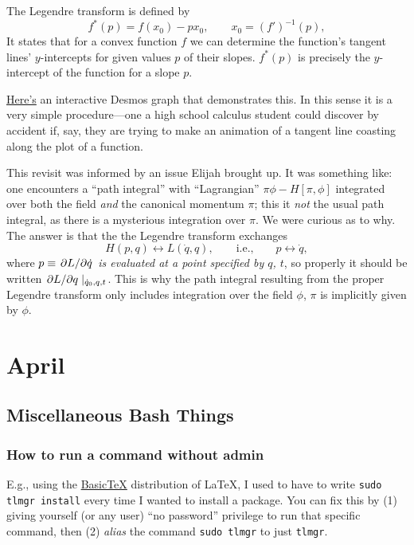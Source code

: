 \documentclass{report}
\begin{document}
\begin{thinbluebox}
The Legendre transform is defined by 
\begin{equation*}
	f^\ast(p) = f(x_0) - px_0, 
	\qquad x_0 = (f')^{-1}(p),
\end{equation*}
It states that for a convex function $ f $ we can determine the function's 
tangent lines' $ y $-intercepts for given values $ p $ of their slopes.
$ f^\ast(p) $ is precisely the $ y $-intercept of the function for a slope $ p $.
\end{thinbluebox}

\href{https://www.desmos.com/calculator/fmvcupzb4t}{Here's} an interactive 
Desmos graph that demonstrates this. In this sense it is a very simple 
procedure---one a high school calculus student could discover by accident if, 
say, they are trying to make an animation of a tangent line coasting along 
the plot of a function. 

This revisit was informed by an issue Elijah brought up. It was something like: 
one encounters a ``path integral'' with ``Lagrangian'' $ \pi \phi - H[\pi, \phi] $
integrated over both the field \textit{and} the canonical momentum $ \pi $; 
this it \textit{not} the usual path integral, as there is a mysterious 
integration over $ \pi $. We were curious as to why. The answer is that the 
the Legendre transform exchanges 
\begin{equation*}
	H(p, q) \longleftrightarrow L(\dot{q}, q), 
	\qquad 
	\text{i.e.,}\qquad p \longleftrightarrow \dot{q},
\end{equation*}
where $ p\equiv\pdv*{L}{\dot{q}} $ \textit{is evaluated at a point specified by
$ q $, $ t $}, so properly it should be written $ \pdv*{L}{q}\vert_{\dot{q}_0,
q, t} $. This is why the path integral resulting from the proper Legendre
transform only includes integration over the field $ \phi $, $ \pi $ is
implicitly given by $ \phi $. 

\chapter{April}
\begin{tocbox}
\minitoc
\end{tocbox}

\section{Miscellaneous Bash Things}
\subsection{How to run a command without admin}
E.g., using the \href{https://www.tug.org/mactex/morepackages.html}{BasicTeX}
distribution of \LaTeX, I used to have to write \texttt{sudo tlmgr install} 
every time I wanted to install a package. You can fix this by (1) giving yourself 
(or any user) ``no password'' privilege to run that specific command, then (2)
\textit{alias} the command \texttt{sudo tlmgr} to just
\texttt{tlmgr}.
\end{document}
